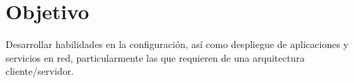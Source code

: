 \section{Objetivo}

Desarrollar habilidades en la configuración, así como despliegue de aplicaciones
y servicios en red, particularmente las que requieren de una arquitectura
cliente/servidor.